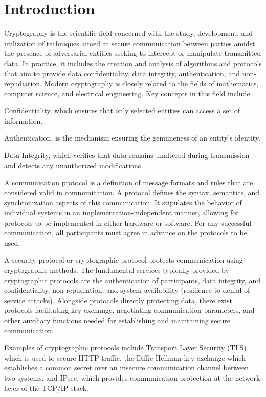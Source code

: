 
\section{Introduction}
Cryptography is the scientific field concerned with the study, development, and utilization of techniques aimed at secure communication between parties amidst the presence of adversarial entities seeking to intercept or manipulate transmitted data. In practice, it includes the creation and analysis of algorithms and protocols that aim to provide data confidentiality, data integrity, authentication, and non-repudiation. Modern cryptography is closely related to the fields of mathematics, computer science, and electrical engineering. Key concepts in this field include:
\begin{outline}
\1 Confidentiality, which ensures that only selected entities can access a set of information.

\1 Authentication, is the mechanism ensuring the genuineness of an entity's identity.

\1 Data Integrity, which verifies that data remains unaltered during transmission and detects any unauthorized modifications.
\end{outline}

A communication protocol is a definition of message formats and rules that are considered valid in communication. A protocol defines the syntax, semantics, and synchronization aspects of this communication. It stipulates the behavior of individual systems in an implementation-independent manner, allowing for protocols to be implemented in either hardware or software. For any successful communication, all participants must agree in advance on the protocols to be used.

A security protocol or cryptographic protocol protects communication using cryptographic methods. The fundamental services typically provided by cryptographic protocols are the authentication of participants, data integrity, and confidentiality, non-repudiation, and system availability (resilience to denial-of-service attacks). Alongside protocols directly protecting data, there exist protocols facilitating key exchange, negotiating communication parameters, and other auxiliary functions needed for establishing and maintaining secure communication.

Examples of cryptographic protocols include Transport Layer Security (TLS) which is used to secure HTTP traffic, the Diffie-Hellman key exchange which establishes a common secret over an insecure communication channel between two systems, and IPsec, which provides communication protection at the network layer of the TCP/IP stack.


